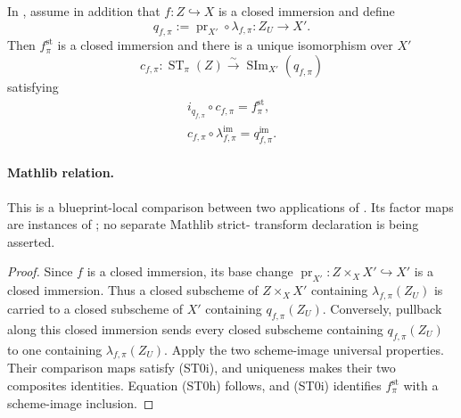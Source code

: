 \begin{lemma}
  \label{lemma:nagata-strict-transform-scheme-image-comparison}

  In , assume in addition that
  $f\colon Z\hookrightarrow X$ is a closed immersion and define
  \[
    q_{f,\pi}:=
      \operatorname{pr}_{X'}\circ\lambda_{f,\pi}
      \colon Z_U\longrightarrow X'.                             \tag{ST0g}
  \]
  Then $f^{\mathrm{st}}_\pi$ is a closed immersion and there is a unique
  isomorphism over $X'$
  \[
    c_{f,\pi}\colon
      \operatorname{ST}_{\pi}(Z)
        \xrightarrow{\sim}
      \operatorname{SIm}_{X'}(q_{f,\pi})                         \tag{ST0h}
  \]
  satisfying
  \[
  \begin{gathered}
    i_{q_{f,\pi}}\circ c_{f,\pi}=f^{\mathrm{st}}_\pi,\\
    c_{f,\pi}\circ\lambda_{f,\pi}^{\mathrm{im}}
      =q_{f,\pi}^{\mathrm{im}}.
  \end{gathered}                                                   \tag{ST0i}
  \]

  \paragraph{Mathlib relation.}
  This is a blueprint-local comparison between two applications of
  \texttt{}.  Its factor maps are instances of
  \texttt{}; no separate Mathlib strict-
  transform declaration is being asserted.
\end{lemma}

\begin{proof}
  Since $f$ is a closed immersion, its base change
  $\operatorname{pr}_{X'}\colon Z\times_XX'\hookrightarrow X'$ is a closed
  immersion.  Thus a closed subscheme of $Z\times_XX'$ containing
  $\lambda_{f,\pi}(Z_U)$ is carried to a closed subscheme of $X'$ containing
  $q_{f,\pi}(Z_U)$.  Conversely, pullback along this closed immersion sends
  every closed subscheme containing $q_{f,\pi}(Z_U)$ to one containing
  $\lambda_{f,\pi}(Z_U)$.  Apply the two scheme-image universal properties.
  Their comparison maps satisfy (ST0i), and uniqueness makes their two
  composites identities.  Equation (ST0h) follows, and (ST0i) identifies
  $f^{\mathrm{st}}_\pi$ with a scheme-image inclusion.
\end{proof}

